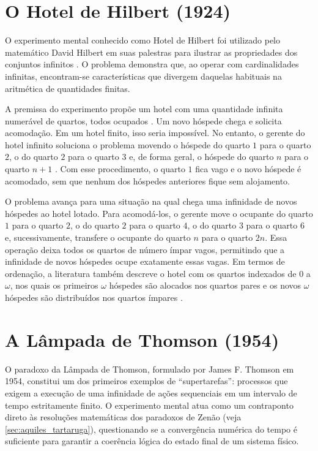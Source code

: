 \section{O Hotel de Hilbert (1924)}

O experimento mental conhecido como Hotel de Hilbert foi utilizado pelo matemático David Hilbert em suas palestras para ilustrar as propriedades dos conjuntos infinitos \parencite[p.~17]{gamow1988}. O problema demonstra que, ao operar com cardinalidades infinitas, encontram-se características que divergem daquelas habituais na aritmética de quantidades finitas.

A premissa do experimento propõe um hotel com uma quantidade infinita numerável de quartos, todos ocupados \parencite[p.~73]{rucker2019}. Um novo hóspede chega e solicita acomodação. Em um hotel finito, isso seria impossível. No entanto, o gerente do hotel infinito soluciona o problema movendo o hóspede do quarto \(1\) para o quarto \(2\), o do quarto \(2\) para o quarto \(3\) e, de forma geral, o hóspede do quarto \(n\) para o quarto \(n+1\) \parencite[p.~17]{gamow1988}. Com esse procedimento, o quarto \(1\) fica vago e o novo hóspede é acomodado, sem que nenhum dos hóspedes anteriores fique sem alojamento.

O problema avança para uma situação na qual chega uma infinidade de novos hóspedes ao hotel lotado. Para acomodá-los, o gerente move o ocupante do quarto \(1\) para o quarto \(2\), o do quarto \(2\) para o quarto \(4\), o do quarto \(3\) para o quarto \(6\) e, sucessivamente, transfere o ocupante do quarto \(n\) para o quarto \(2n\). Essa operação deixa todos os quartos de número ímpar vagos, permitindo que a infinidade de novos hóspedes ocupe exatamente essas vagas. Em termos de ordenação, a literatura também descreve o hotel com os quartos indexados de \(0\) a \(\omega\), nos quais os primeiros \(\omega\) hóspedes são alocados nos quartos pares e os novos \(\omega\) hóspedes são distribuídos nos quartos ímpares \parencite[p.~75]{rucker2019}.



\section{A Lâmpada de Thomson (1954)}
\label{sec:lampada_thomson}

O paradoxo da Lâmpada de Thomson, formulado por James F. Thomson em 1954, constitui um dos primeiros exemplos de ``supertarefas'': processos que exigem a execução de uma infinidade de ações sequenciais em um intervalo de tempo estritamente finito. O experimento mental atua como um contraponto direto às resoluções matemáticas dos paradoxos de Zenão (veja \autoref{sec:aquiles_tartaruga}), questionando se a convergência numérica do tempo é suficiente para garantir a coerência lógica do estado final de um sistema físico.

